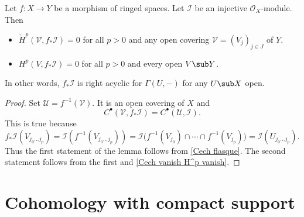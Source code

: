 \begin{proposition}\label{push injective}
Let $f:X\to Y$ be a morphism of ringed spaces. Let $\mathscr{I}$ be an injective $\mathscr{O}_X$-module. Then
\begin{itemize}
\item $\check{H}^p(\mathcal{V},f_*\mathscr{I})=0$ for all $p>0$ and any open covering $\mathcal{V}=(V_j)_{j\in J}$ of $Y$.
\item $H^p(V,f_*\mathscr{I})=0$ for all $p>0$ and every open $V\sub Y$.
\end{itemize}
In other words, $f_*\mathscr{I}$ is right acyclic for $\Gamma(U,-)$ for any $U\sub X$ open.
\end{proposition}
\begin{proof}
Set $\mathcal{U}=f^{-1}(\mathcal{V})$. It is an open covering of $X$ and
\[C^\bullet(\mathcal{V},f_*\mathscr{I})=C^\bullet(\mathcal{U},\mathscr{I}).\]
This is true because
\[f_*\mathscr{I}(V_{j_0\dots j_p})=\mathscr{I}(f^{-1}(V_{j_0\dots j_p}))=\mathscr{I}\big(f^{-1}(V_{j_0})\cap\cdots\cap f^{-1}(V_{j_p})\big)=\mathscr{I}(U_{j_0\dots j_p}).\]
Thus the first statement of the lemma follows from \cref{Cech flasque}. The second statement follows from the first and \cref{Cech vanish H^p vanish}.
\end{proof}

\section{Cohomology with compact support}
